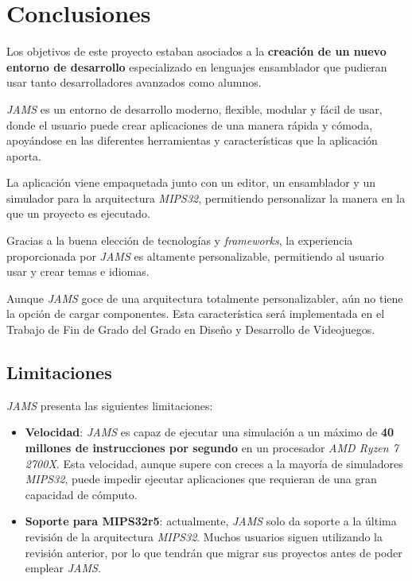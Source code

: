 \chapter{Conclusiones}\label{ch:conclusiones}

Los objetivos de este proyecto estaban asociados a la \textbf{creación
de un nuevo entorno de desarrollo} especializado en lenguajes
ensamblador que pudieran usar tanto desarrolladores avanzados
como alumnos.

\noindent \textit{JAMS} es un entorno de desarrollo moderno,
flexible, modular y fácil de usar, donde el usuario puede
crear aplicaciones de una manera rápida y cómoda,
apoyándose en las diferentes herramientas y
características que la aplicación aporta.

\noindent La aplicación viene empaquetada junto con un
editor, un ensamblador y un simulador para la arquitectura
\textit{MIPS32}, permitiendo personalizar la manera en la
que un proyecto es ejecutado.

\noindent Gracias a la buena elección de tecnologías y
\textit{frameworks}, la experiencia proporcionada por
\textit{JAMS} es altamente personalizable, permitiendo
al usuario usar y crear temas e idiomas.

\noindent Aunque \textit{JAMS} goce de una arquitectura
totalmente personalizabler, aún no tiene la opción de cargar componentes.
Esta característica será implementada en el Trabajo de Fin de
Grado del Grado en Diseño y Desarrollo de Videojuegos.

\section{Limitaciones}\label{sec:limitaciones}

\textit{JAMS} presenta las siguientes limitaciones:

\begin{itemize}
    \item \textbf{Velocidad}: \textit{JAMS} es capaz de ejecutar
    una simulación a un máximo de \textbf{40 millones de instrucciones por segundo} en un
    procesador \textit{AMD Ryzen 7 2700X}.
    Esta velocidad, aunque supere con creces a la mayoría de simuladores \textit{MIPS32},
    puede impedir ejecutar aplicaciones que requieran de una gran capacidad de cómputo.
    \item \textbf{Soporte para MIPS32r5}: actualmente, \textit{JAMS} solo da soporte
    a la última revisión de la arquitectura \textit{MIPS32}.
    Muchos usuarios siguen utilizando la revisión anterior, por lo que tendrán que migrar
    sus proyectos antes de poder emplear \textit{JAMS}.
\end{itemize}

